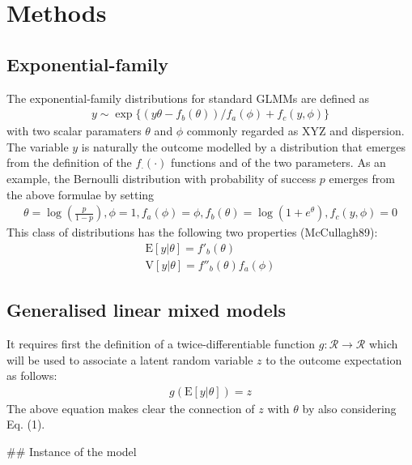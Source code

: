 \section{Methods}

\subsection{Exponential-family}

The exponential-family distributions for standard GLMMs are defined as
\begin{align*}
y \sim \exp\{(y\theta - f_b(\theta))/f_a(\phi) + f_c(y, \phi)\}
\end{align*}
with two scalar paramaters $\theta$ and $\phi$ commonly regarded as XYZ and dispersion. The variable $y$ is naturally the outcome modelled by a distribution that emerges from the definition of the $f_{\cdot}(\cdot)$ functions and of the two parameters. As an example, the Bernoulli distribution with probability of success $p$ emerges from the above formulae by setting
\begin{align*}
\theta = \log\left(\frac{p}{1-p}\right), \phi = 1, f_a(\phi) = \phi, f_b(\theta)=\log(1+e^\theta), f_c(y, \phi) = 0
\end{align*}
This class of distributions has the following two properties (McCullagh89):
\begin{align*}

\mathrm E[y|\theta] = f'_b(\theta)\\
\mathrm V[y|\theta] = f''_b(\theta) f_a(\phi) \tag{1}

\end{align*}

\subsection{Generalised linear mixed models}

It requires first the definition of a twice-differentiable  function $g:\mathcal R \rightarrow \mathcal R$ which will be used to associate a latent random variable $z$ to the outcome expectation as follows:
\begin{align*}
g(\mathrm E[y|\theta]) = z  \tag{2}
\end{align*}
The above equation makes clear the connection of $z$ with $\theta$ by also considering Eq. (1).

## Instance of the model

